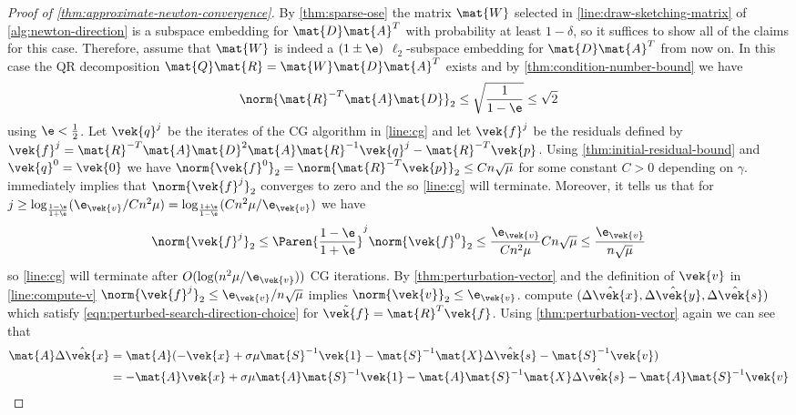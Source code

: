 \begin{proof}[Proof of \cref{thm:approximate-newton-convergence}]
  By \cref{thm:sparse-ose} the matrix \(\mat{W}\) selected in \cref{line:draw-sketching-matrix} of \cref{alg:newton-direction} is a subspace embedding for \(\mat{D}\mat{A}^T\) with probability at least \(1 - \delta\), so it suffices to show all of the claims for this case.
  Therefore, assume that \(\mat{W}\) is indeed a \((1 \pm \e)\) \(\ell_2\)-subspace embedding for \(\mat{D}\mat{A}^T\) from now on.
  In this case the QR decomposition \(\mat{Q}\mat{R} = \mat{W}\mat{D}\mat{A}^T\) exists and by \cref{thm:condition-number-bound} we have
  \[\norm{\mat{R}^{-T}\mat{A}\mat{D}}_2 \leq \sqrt{\frac{1}{1 - \e}} \leq \sqrt{2}\]
  using \(\e < \frac{1}{2}\).
  Let \(\vek{q}^j\) be the iterates of the CG algorithm in \cref{line:cg} and let \(\vek{f}^j\) be the residuals defined by
\( \vek{f}^j = \mat{R}^{-T} \mat{A} \mat{D}^2 \mat{A} \mat{R}^{-1} \vek{q}^j - \mat{R}^{-T} \vek{p} \).
  Using \cref{thm:initial-residual-bound} and \(\vek{q}^0 = \vek{0}\) we have \(\norm{\vek{f}^0}_2 = \norm{\mat{R}^{-T} \vek{p}}_2 \leq Cn\sqrt{\mu}\) for some constant \(C > 0\) depending on \(\gamma\).
   immediately implies that \(\norm{\vek{f}^j}_2\) converges to zero and the so \cref{line:cg} will terminate.
  Moreover, it tells us that for \(j \geq \log_{\frac{1 - \e}{1 + \e}}(\e_{\vek{v}}/C n^2 \mu) = \log_{\frac{1 + \e}{1 - \e}}(C n^2 \mu / \e_{\vek{v}})\) we have
  \[ \norm{\vek{f}^j}_2 \leq \Paren{\frac{1 - \e}{1 + \e}}^j \norm{\vek{f}^0}_2 \leq \frac{\e_{\vek{v}}}{C n^2 \mu} C n \sqrt{\mu} \leq \frac{\e_{\vek{v}}}{n \sqrt{\mu}} \]
  so \cref{line:cg} will terminate after \(O(\log(n^2 \mu / \e_{\vek{v}}))\) CG iterations.
  By \cref{thm:perturbation-vector} and the definition of \(\vek{v}\) in \cref{line:compute-v} \(\norm{\vek{f}^j}_2 \leq \e_{\vek{v}}/n\sqrt{\mu}\) implies \(\norm{\vek{v}}_2 \leq \e_{\vek{v}}\).
   compute \((\hat{\Delta\vek{x}}, \hat{\Delta\vek{y}}, \hat{\Delta\vek{s}})\) which satisfy \cref{eqn:perturbed-search-direction-choice} for \(\tilde{\vek{f}} = \mat{R}^T \vek{f}\).
  Using \cref{thm:perturbation-vector} again we can see that
  \begin{align*}
    \mat{A}\hat{\Delta\vek{x}} 
    &= \mat{A} (-\vek{x} + \sigma \mu \mat{S}^{-1}\vek{1} - \mat{S}^{-1}\mat{X}\hat{\Delta\vek{s}} - \mat{S}^{-1}\vek{v}) \\
    &= -\mat{A}\vek{x} + \sigma \mu \mat{A}\mat{S}^{-1}\vek{1} - \mat{A}\mat{S}^{-1}\mat{X}\hat{\Delta\vek{s}} - \mat{A}\mat{S}^{-1}\vek{v} \\

\end{align*}
\end{proof}
